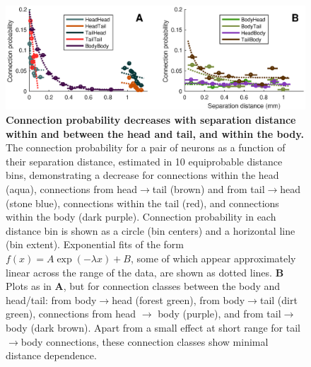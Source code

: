 \documentclass[10pt,letterpaper]{article}
\begin{document}
\begin{figure}[h]
  \centering
    \includegraphics[width=\textwidth]{connectionProbability.eps}
  \caption{
\textbf{Connection probability decreases with separation distance within and between the head and tail, and within the body.}
The connection probability for a pair of neurons as a function of their separation distance, estimated in 10 equiprobable distance bins, demonstrating a decrease for connections within the head (aqua), connections from head$\rightarrow$tail (brown) and from tail$\rightarrow$head (stone blue), connections within the tail (red), and connections within the body (dark purple).
Connection probability in each distance bin is shown as a circle (bin centers) and a horizontal line (bin extent).
Exponential fits of the form $f(x) = A\exp(-\lambda x) + B$, some of which appear approximately linear across the range of the data, are shown as dotted lines.
\textbf{B}
Plots as in \textbf{A}, but for connection classes between the body and head/tail: from body$\rightarrow$head (forest green), from body$\rightarrow$tail (dirt green), connections from head $\rightarrow$ body (purple), and from tail$\rightarrow$body (dark brown).
Apart from a small effect at short range for tail$\rightarrow$body connections, these connection classes show minimal distance dependence.
  }
  \label{fig:spatialEffectsMain}
\end{figure}
\end{document}
